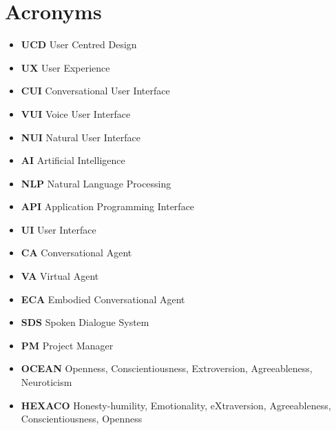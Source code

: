\chapter*{Acronyms}

\begin{itemize}[label={}]
    \item \textbf{UCD} \hspace{2mm} User Centred Design
    \item \textbf{UX} \hspace{2mm} User Experience
    \item \textbf{CUI} \hspace{2mm} Conversational User Interface
    \item \textbf{VUI} \hspace{2mm} Voice User Interface
    \item \textbf{NUI} \hspace{2mm} Natural User Interface
    \item \textbf{AI} \hspace{2mm} Artificial Intelligence
    \item \textbf{NLP} \hspace{2mm} Natural Language Processing
    \item \textbf{API} \hspace{2mm} Application Programming Interface
    \item \textbf{UI} \hspace{2mm} User Interface
    \item \textbf{CA} \hspace{2mm} Conversational Agent
    \item \textbf{VA} \hspace{2mm} Virtual Agent
    \item \textbf{ECA} \hspace{2mm} Embodied Conversational Agent
    \item \textbf{SDS} \hspace{2mm} Spoken Dialogue System
    \item \textbf{PM} \hspace{2mm} Project Manager
    \item \textbf{OCEAN} \hspace{2mm} Openness, Conscientiousness, Extroversion, Agreeableness, Neuroticism
    \item \textbf{HEXACO} \hspace{2mm} Honesty-humility, Emotionality, eXtraversion, Agreeableness, Conscientiousness, Openness

\end{itemize}
